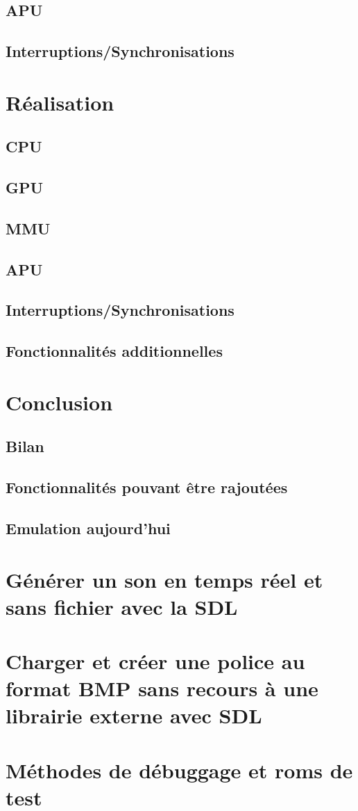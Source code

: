 \documentclass{report}
\begin{document}
\section{APU}
\section{Interruptions/Synchronisations}
\chapter{Réalisation}
\section{CPU}
\section{GPU}
\section{MMU}
\section{APU}
\section{Interruptions/Synchronisations}
\section{Fonctionnalités additionnelles}
\chapter{Conclusion}
\section{Bilan}
\section{Fonctionnalités pouvant être rajoutées}
\section{Emulation aujourd'hui}

\appendix
\chapter{Générer un son en temps réel et sans fichier avec la SDL}
\chapter{Charger et créer une police au format BMP sans recours à une librairie externe avec SDL}
\chapter{Méthodes de débuggage et roms de test}
\end{document}
